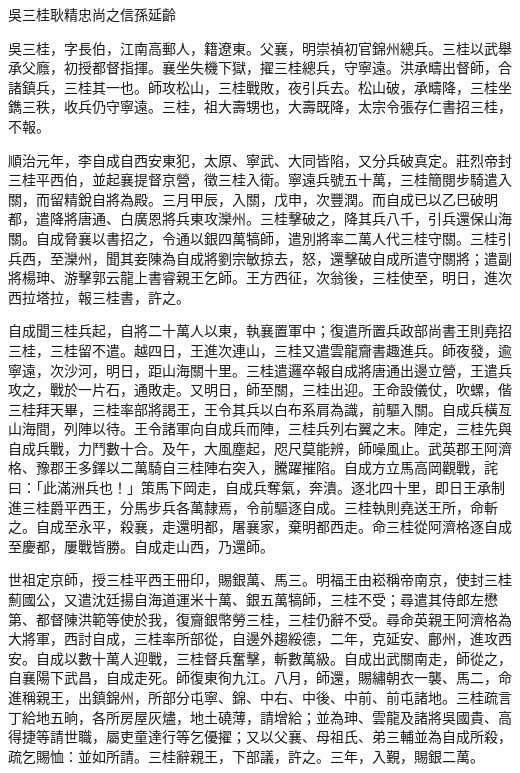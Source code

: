 
\begin{pinyinscope}
吳三桂耿精忠尚之信孫延齡

吳三桂，字長伯，江南高郵人，籍遼東。父襄，明崇禎初官錦州總兵。三桂以武舉承父廕，初授都督指揮。襄坐失機下獄，擢三桂總兵，守寧遠。洪承疇出督師，合諸鎮兵，三桂其一也。師攻松山，三桂戰敗，夜引兵去。松山破，承疇降，三桂坐鐫三秩，收兵仍守寧遠。三桂，祖大壽甥也，大壽既降，太宗令張存仁書招三桂，不報。

順治元年，李自成自西安東犯，太原、寧武、大同皆陷，又分兵破真定。莊烈帝封三桂平西伯，並起襄提督京營，徵三桂入衛。寧遠兵號五十萬，三桂簡閱步騎遣入關，而留精銳自將為殿。三月甲辰，入關，戊申，次豐潤。而自成已以乙巳破明都，遣降將唐通、白廣恩將兵東攻灤州。三桂擊破之，降其兵八千，引兵還保山海關。自成脅襄以書招之，令通以銀四萬犒師，遣別將率二萬人代三桂守關。三桂引兵西，至灤州，聞其妾陳為自成將劉宗敏掠去，怒，還擊破自成所遣守關將；遣副將楊珅、游擊郭云龍上書睿親王乞師。王方西征，次翁後，三桂使至，明日，進次西拉塔拉，報三桂書，許之。

自成聞三桂兵起，自將二十萬人以東，執襄置軍中；復遣所置兵政部尚書王則堯招三桂，三桂留不遣。越四日，王進次連山，三桂又遣雲龍齎書趣進兵。師夜發，逾寧遠，次沙河，明日，距山海關十里。三桂遣邏卒報自成將唐通出邊立營，王遣兵攻之，戰於一片石，通敗走。又明日，師至關，三桂出迎。王命設儀仗，吹螺，偕三桂拜天畢，三桂率部將謁王，王令其兵以白布系肩為識，前驅入關。自成兵橫亙山海間，列陣以待。王令諸軍向自成兵而陣，三桂兵列右翼之末。陣定，三桂先與自成兵戰，力鬥數十合。及午，大風塵起，咫尺莫能辨，師噪風止。武英郡王阿濟格、豫郡王多鐸以二萬騎自三桂陣右突入，騰躍摧陷。自成方立馬高岡觀戰，詫曰：「此滿洲兵也！」策馬下岡走，自成兵奪氣，奔潰。逐北四十里，即日王承制進三桂爵平西王，分馬步兵各萬隸焉，令前驅逐自成。三桂執則堯送王所，命斬之。自成至永平，殺襄，走還明都，屠襄家，棄明都西走。命三桂從阿濟格逐自成至慶都，屢戰皆勝。自成走山西，乃還師。

世祖定京師，授三桂平西王冊印，賜銀萬、馬三。明福王由崧稱帝南京，使封三桂薊國公，又遣沈廷揚自海道運米十萬、銀五萬犒師，三桂不受；尋遣其侍郎左懋第、都督陳洪範等使於我，復齎銀幣勞三桂，三桂仍辭不受。尋命英親王阿濟格為大將軍，西討自成，三桂率所部從，自邊外趨綏德，二年，克延安、鄜州，進攻西安。自成以數十萬人迎戰，三桂督兵奮擊，斬數萬級。自成出武關南走，師從之，自襄陽下武昌，自成走死。師復東徇九江。八月，師還，賜繡朝衣一襲、馬二，命進稱親王，出鎮錦州，所部分屯寧、錦、中右、中後、中前、前屯諸地。三桂疏言丁給地五晌，各所房屋灰燼，地土磽薄，請增給；並為珅、雲龍及諸將吳國貴、高得捷等請世職，屬吏童達行等乞優擢；又以父襄、母祖氏、弟三輔並為自成所殺，疏乞賜恤：並如所請。三桂辭親王，下部議，許之。三年，入覲，賜銀二萬。


\end{pinyinscope}
